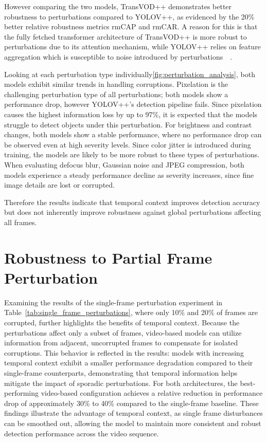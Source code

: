 \documentclass[final,twoside]{vutinfth}
\begin{document}
However comparing the two models, TransVOD++ demonstrates better robustness to perturbations compared to YOLOV++, as evidenced by the 20\% better relative robustness metrics rmCAP and rmCAR.\@
A reason for this is that the fully fetched transformer architecture of TransVOD++ is more robust to perturbations due to its attention mechanism, while YOLOV++ relies on feature aggregation which is susceptible to noise introduced by perturbations~\cite{zhou2022understandingvitrobustness}~\cite{gu2021vitpatchrobustness}.

Looking at each perturbation type individually\ref{fig:perturbation_analysis}, both models exhibit similar trends in handling corruptions.
Pixelation is the challenging perturbation type of all perturbations; both models show a performance drop, however YOLOV++'s detection pipeline fails.
Since pixelation causes the highest information loss by up to 97\%, it is expected that the models struggle to detect objects under this perturbation.
For brightness and contrast changes, both models show a stable performance, where no performance drop can be observed even at high severity levels.
Since color jitter is introduced during training, the models are likely to be more robust to these types of perturbations.
When evaluating defocus blur, Gaussian noise and JPEG compression, both models experience a steady performance decline as severity increases, since fine image details are lost or corrupted.

Therefore the results indicate that temporal context improves detection accuracy but does not inherently improve robustness against global perturbations affecting all frames. 
\section{Robustness to Partial Frame Perturbation}
Examining the results of the single-frame perturbation experiment in Table~\ref{tab:single_frame_perturbations}, where only 10\% and 20\% of frames are corrupted, further highlights the benefits of temporal context.
Because the perturbations affect only a subset of frames, video-based models can utilize information from adjacent, uncorrupted frames to compensate for isolated corruptions.
This behavior is reflected in the results: models with increasing temporal context exhibit a smaller performance degradation compared to their single-frame counterparts, demonstrating that temporal information helps mitigate the impact of sporadic perturbations.
For both architectures, the best-performing video-based configuration achieves a relative reduction in performance drop of approximately 30\% to 40\% compared to the single-frame baseline.
These findings illustrate the advantage of temporal context, as single frame disturbances can be smoothed out, allowing the model to maintain more consistent and robust detection performance across the video sequence.
\end{document}
